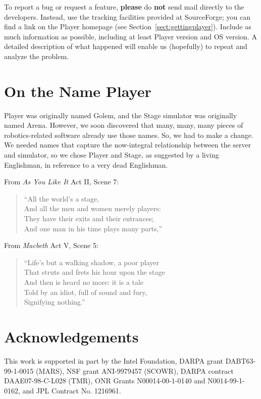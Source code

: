 \documentclass[11pt]{report}
\begin{document}
To report a bug or request a feature, {\bf please} do {\bf not} send
mail directly to the developers.  Instead, use the tracking facilities
provided at SourceForge; you can find a link on the Player homepage
(see Section~\ref{sect:gettingplayer}).  Include as much information as
possible, including at least Player version and OS version.  A detailed
description of what happened will enable us (hopefully) to repeat and
analyze the problem.

\section{On the Name Player}
Player was originally named Golem, and the Stage simulator was originally
named Arena.  However, we soon discovered that many,
many, many pieces of robotics-related software already use those names.
So, we had to make a change.  We needed names that capture the now-integral
relationship between the server and simulator, so we chose Player and
Stage, as suggested by a living Englishman, in reference to a
very dead Englishman.

\vspace*{1em}

\noindent
From {\em As You Like It} Act II, Scene 7:
\begin{quote}
  ``All the world's a stage, \\
  And all the men and women merely players: \\
  They have their exits and their entrances; \\
  And one man in his time plays many parts,''\\
\end{quote}

\noindent
From {\em Macbeth} Act V, Scene 5:
\begin{quote}
  ``Life's but a walking shadow, a poor player \\
  That struts and frets his hour upon the stage \\
  And then is heard no more: it is a tale \\
  Told by an idiot, full of sound and fury, \\
  Signifying nothing.''\\
\end{quote}

\section{Acknowledgements}
This work is supported in part by the Intel Foundation, DARPA grant
DABT63-99-1-0015 (MARS), NSF grant ANI-9979457 (SCOWR), DARPA contract
DAAE07-98-C-L028 (TMR), ONR Grants N00014-00-1-0140 and N0014-99-1-0162,
and JPL Contract No. 1216961.
\end{document}
